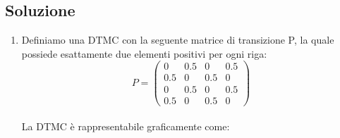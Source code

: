 \documentclass[
	12pt, %
]{fphw}
\begin{document}
\subsection*{Soluzione}
\begin{enumerate}
	\item Definiamo una DTMC con la seguente matrice di transizione P, la quale possiede esattamente due elementi positivi per ogni riga:\\
	\begin{equation*}
	P = \begin{pmatrix}
		0 & 0.5 & 0 & 0.5\\
		0.5 & 0 & 0.5 & 0\\
		0 & 0.5 & 0 & 0.5\\
		0.5 & 0 & 0.5 & 0
	\end{pmatrix}
	\end{equation*}\\
	La DTMC è rappresentabile graficamente come:\\


\end{enumerate}
\end{document}
